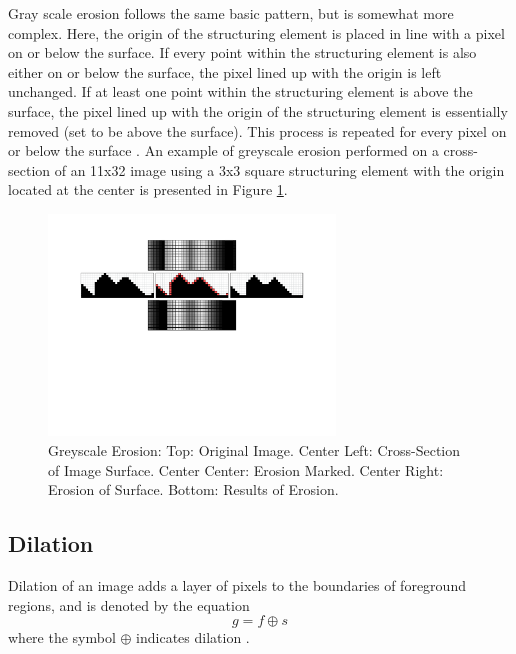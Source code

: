 \documentclass{sig-alternate}
\begin{document}
Gray scale erosion follows the same basic pattern, but is somewhat more complex. Here, the origin of the structuring element is placed in line with a pixel on or below the surface. If every point within the structuring element is also either on or below the surface, the pixel lined up with the origin is left unchanged. If at least one point within the structuring element is above the surface, the pixel lined up with the origin of the structuring element is essentially removed (set to be above the surface). This process is repeated for every pixel on or below the surface \cite{MorphologyPaper:1987, MorphologyWiki}. An example of greyscale erosion performed on a cross-section of an 11x32 image using a 3x3 square structuring element with the origin located at the center is presented in Figure \ref{greyscale erosion figure}.
\begin{figure}
\centering
\includegraphics[width=3in,trim={0 4in 0 0},clip]{greyscale_erosion}
\caption{Greyscale Erosion: Top: Original Image. Center Left: Cross-Section of Image Surface. Center Center: Erosion Marked. Center Right: Erosion of Surface. Bottom: Results of Erosion.}
\label{greyscale erosion figure}
\end{figure}

\subsection{Dilation}\label{dilation}
Dilation of an image adds a layer of pixels to the boundaries of foreground regions, and is denoted by the equation
\begin{equation*}
g = f \oplus s
\end{equation*}
where the symbol $\oplus$ indicates dilation \cite{MorphologyWikiAnonymous, MorphologyBook:2000}.
\end{document}
